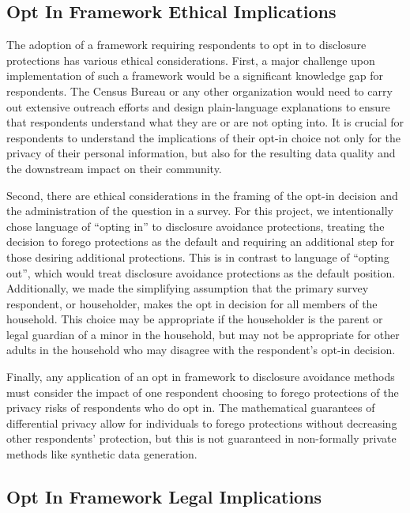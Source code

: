 \documentclass[
]{urban-formatting}
\begin{document}
\subsection{Opt In Framework Ethical Implications}

The adoption of a framework requiring respondents to opt in to
disclosure protections has various ethical considerations. First, a
major challenge upon implementation of such a framework would be a
significant knowledge gap for respondents. The Census Bureau or any
other organization would need to carry out extensive outreach efforts
and design plain-language explanations to ensure that respondents
understand what they are or are not opting into. It is crucial for
respondents to understand the implications of their opt-in choice not
only for the privacy of their personal information, but also for the
resulting data quality and the downstream impact on their community.

Second, there are ethical considerations in the framing of the opt-in
decision and the administration of the question in a survey. For this
project, we intentionally chose language of ``opting in'' to disclosure
avoidance protections, treating the decision to forego protections as
the default and requiring an additional step for those desiring
additional protections. This is in contrast to language of ``opting
out'', which would treat disclosure avoidance protections as the default
position. Additionally, we made the simplifying assumption that the
primary survey respondent, or householder, makes the opt in decision for
all members of the household. This choice may be appropriate if the
householder is the parent or legal guardian of a minor in the household,
but may not be appropriate for other adults in the household who may
disagree with the respondent's opt-in decision.

Finally, any application of an opt in framework to disclosure avoidance
methods must consider the impact of one respondent choosing to forego
protections of the privacy risks of respondents who do opt in. The
mathematical guarantees of differential privacy allow for individuals to
forego protections without decreasing other respondents' protection, but
this is not guaranteed in non-formally private methods like synthetic
data generation.

\subsection{Opt In Framework Legal Implications}
\end{document}
